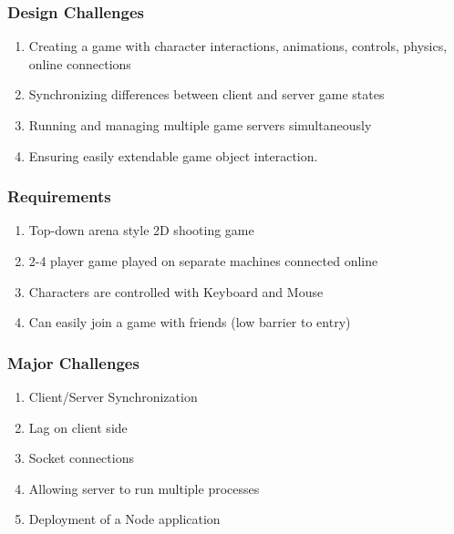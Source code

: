 \documentclass{beamer}
\begin{document}

\begin{frame}
\frametitle{Design Challenges}
\begin{enumerate}
  \item Creating a game with character interactions, animations, controls, physics, online connections
  \item Synchronizing differences between client and server game states
  \item Running and managing multiple game servers simultaneously
  \item Ensuring easily extendable game object interaction. 
\end{enumerate}
\end{frame}

\begin{frame}
\frametitle{Requirements}
\begin{enumerate}
  \item Top-down arena style 2D shooting game
  \item 2-4 player game played on separate machines connected online
  \item Characters are controlled with Keyboard and Mouse
  \item Can easily join a game with friends (low barrier to entry)
\end{enumerate}
\end{frame}

\begin{frame}
\frametitle{Major Challenges}
\begin{enumerate}
  \item Client/Server Synchronization
\item Lag on client side
\item Socket connections
\item Allowing server to run multiple processes
\item Deployment of a Node application
\end{enumerate}
\end{frame}
\end{document}
